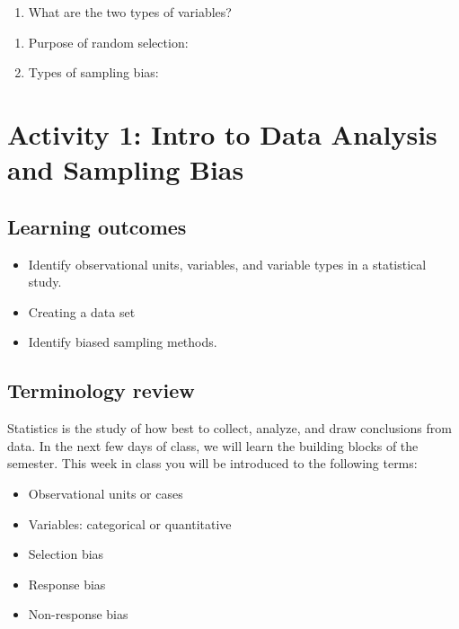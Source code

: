 \documentclass[
]{report}
\providecommand{\tightlist}{%
  \setlength{\itemsep}{0pt}\setlength{\parskip}{0pt}}
\begin{document}
\begin{enumerate}
\def\labelenumi{\arabic{enumi}.}
\tightlist
\item
  What are the two types of variables?
\end{enumerate}

\vspace{0.3in}

\begin{enumerate}
\def\labelenumi{\arabic{enumi}.}
\setcounter{enumi}{1}
\item
  Purpose of random selection:
  \vspace{0.6in}
\item
  Types of sampling bias:
\end{enumerate}

\vspace{0.5in}

\newpage

\section{Activity 1: Intro to Data Analysis and Sampling Bias}\label{activity-1-intro-to-data-analysis-and-sampling-bias}


\subsection{Learning outcomes}\label{learning-outcomes}

\begin{itemize}
\item
  Identify observational units, variables, and variable types in a statistical study.
\item
  Creating a data set
\item
  Identify biased sampling methods.
\end{itemize}

\subsection{Terminology review}\label{terminology-review}

Statistics is the study of how best to collect, analyze, and draw conclusions from data. In the next few days of class, we will learn the building blocks of the semester. This week in class you will be introduced to the following terms:

\begin{itemize}
\item
  Observational units or cases
\item
  Variables: categorical or quantitative
\item
  Selection bias
\item
  Response bias
\item
  Non-response bias
\end{itemize}
\end{document}
